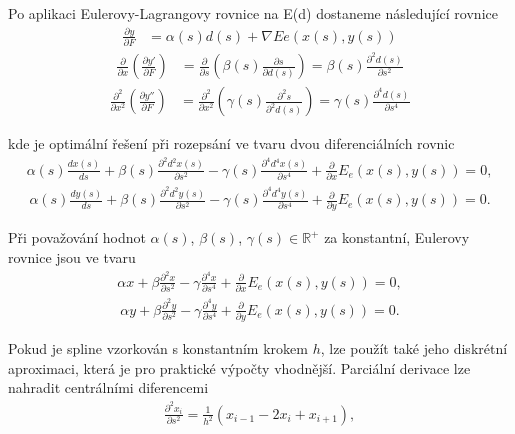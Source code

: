 \documentclass[a4paper,12pt]{article}
\begin{document}
    Po aplikaci Eulerovy-Lagrangovy rovnice na E(d) dostaneme následující rovnice
    \begin{align*}
    \frac{\partial y}{\partial F} &= \alpha(s)d(s) + \nabla Ee(x(s),y(s))
    \end{align*}
    \begin{align*}
    \frac{\partial}{\partial x}\left(\frac{\partial y'}{\partial F}\right) &= \frac{\partial}{\partial s}\left(\beta(s)\frac{\partial s}{\partial d(s)}\right) = \beta(s)\frac{\partial^2 d(s)}{\partial s^2}
    \end{align*}
    \begin{align*}
    \frac{\partial^2}{\partial x^2}\left(\frac{\partial y''}{\partial F}\right) &= \frac{\partial^2}{\partial x^2}\left(\gamma(s)\frac{\partial^2 s}{\partial^2 d(s)}\right) = \gamma(s)\frac{\partial^4 d(s)}{\partial s^4}
    \end{align*}
    
    kde je optimální řešení při rozepsání ve tvaru dvou diferenciálních rovnic
    \begin{align*}
    \alpha(s)\frac{{dx(s)}}{{ds}} + \beta(s)\frac{{\partial^2 d^2 x(s)}}{{\partial s^2}} - \gamma(s)\frac{{\partial^4 d^4 x(s)}}{{\partial s^4}} + \frac{{\partial}}{{\partial x}}E_e(x(s), y(s)) = 0,
    \end{align*}
    \begin{align*}
    \alpha(s)\frac{{dy(s)}}{{ds}} + \beta(s)\frac{{\partial^2 d^2 y(s)}}{{\partial s^2}} - \gamma(s)\frac{{\partial^4 d^4 y(s)}}{{\partial s^4}} + \frac{{\partial}}{{\partial y}}E_e(x(s), y(s)) = 0.
    \end{align*}

    Při považování hodnot $\alpha(s)$, $\beta(s)$, $\gamma(s) \in \mathbb{R}^+$ za konstantní, Eulerovy rovnice jsou ve tvaru
    \begin{align*}
    \alpha x + \beta \frac{{\partial^2 x}}{{\partial s^2}} - \gamma \frac{{\partial^4 x}}{{\partial s^4}} + \frac{{\partial}}{{\partial x}}E_e(x(s), y(s)) = 0,
    \end{align*}
    \begin{align*}
    \alpha y + \beta \frac{{\partial^2 y}}{{\partial s^2}} - \gamma \frac{{\partial^4 y}}{{\partial s^4}} + \frac{{\partial}}{{\partial y}}E_e(x(s), y(s)) = 0.
    \end{align*}

    Pokud je spline vzorkován s konstantním krokem $h$, lze použít také jeho diskrétní aproximaci, která je pro praktické výpočty vhodnější. Parciální derivace lze nahradit centrálními diferencemi
    \begin{align*}
    \frac{{\partial^2 x_i}}{{\partial s^2}} = \frac{1}{{h^2}} (x_{i-1} - 2x_i + x_{i+1}),
    \end{align*}
\end{document}
